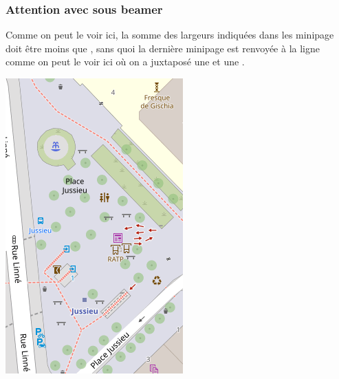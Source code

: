 \begin{frame}
  \frametitle{Attention avec  sous beamer}
  
  \begin{minipage}{0.6\textwidth}
  	Comme on peut le voir ici, la somme des largeurs indiquées dans les minipage doit être moins que  \lin{\textwidth}, sans quoi la dernière minipage est renvoyée à la ligne comme on peut le voir ici où on a juxtaposé une  et une .
  \end{minipage}
  \begin{minipage}{0.4\textwidth}
    \includegraphics[scale=0.45]{pour_exemples/mini_plan.png}
  \end{minipage}
\end{frame}


